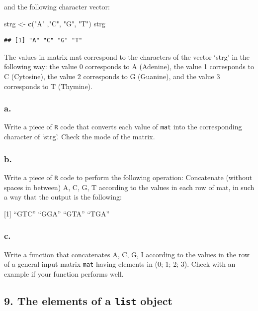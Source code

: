 \documentclass[]{article}
\newenvironment{Shaded}{\begin{snugshade}}{\end{snugshade}}
\newcommand{\KeywordTok}[1]{\textcolor[rgb]{0.13,0.29,0.53}{\textbf{#1}}}
\newcommand{\NormalTok}[1]{#1}
\newcommand{\StringTok}[1]{\textcolor[rgb]{0.31,0.60,0.02}{#1}}
\begin{document}
and the following character vector:

\begin{Shaded}
\begin{Highlighting}[]
\NormalTok{strg <-}\StringTok{ }\KeywordTok{c}\NormalTok{(}\StringTok{"A"}\NormalTok{ ,}\StringTok{"C"}\NormalTok{, }\StringTok{"G"}\NormalTok{, }\StringTok{"T"}\NormalTok{)}
\NormalTok{strg}
\end{Highlighting}
\end{Shaded}

\begin{verbatim}
## [1] "A" "C" "G" "T"
\end{verbatim}

The values in matrix mat correspond to the characters of the vector
`strg' in the following way: the value 0 corresponds to A (Adenine), the
value 1 corresponds to C (Cytosine), the value 2 corresponds to G
(Guanine), and the value 3 corresponds to T (Thymine).

\hypertarget{a.-4}{%
\subsubsection{a.}\label{a.-4}}

Write a piece of \texttt{R} code that converts each value of
\texttt{mat} into the corresponding character of `strg'. Check the mode
of the matrix.

\hypertarget{b.-5}{%
\subsubsection{b.}\label{b.-5}}

Write a piece of \texttt{R} code to perform the following operation:
Concatenate (without spaces in between) A, C, G, T according to the
values in each row of mat, in such a way that the output is the
following:

{[}1{]} ``GTC'' ``GGA'' ``GTA'' ``TGA''

\hypertarget{c.-5}{%
\subsubsection{c.}\label{c.-5}}

Write a function that concatenates A, C, G, I according to the values in
the row of a general input matrix \texttt{mat} having elements in (0; 1;
2; 3). Check with an example if your function performs well.

\hypertarget{the-elements-of-a-list-object}{%
\subsection{\texorpdfstring{9. The elements of a \texttt{list}
object}{9. The elements of a list object}}\label{the-elements-of-a-list-object}}
\end{document}

